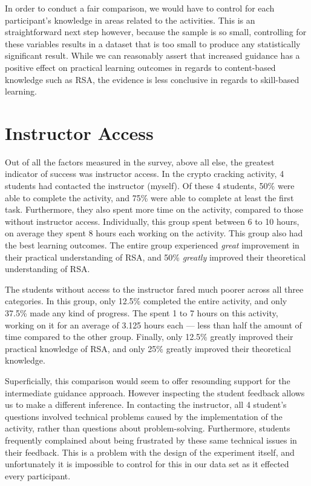         In order to conduct a fair comparison, we would have to control for each participant's knowledge in areas related to the activities. 
        This is an straightforward next step however, because the sample is so small, controlling for these variables results in a dataset that is too small to produce any statistically significant result. 
        While we can reasonably assert that increased guidance has a positive effect on practical learning outcomes in regards to content-based knowledge such as RSA, the evidence is less conclusive in regards to skill-based learning. 


    \section{Instructor Access}
        Out of all the factors measured in the survey, above all else, the greatest indicator of success was instructor access. 
        In the crypto cracking activity, 4 students had contacted the instructor (myself). 
        Of these 4 students, 50\% were able to complete the activity, and 75\% were able to complete at least the first task. 
        Furthermore, they also spent more time on the activity, compared to those without instructor access. 
        Individually, this group spent between 6 to 10 hours, on average they spent 8 hours each working on the activity. 
        This group also had the best learning outcomes. 
        The entire group experienced \emph{great} improvement in their practical understanding of RSA, and 50\% \emph{greatly} improved their theoretical understanding of RSA.

        The students without access to the instructor fared much poorer across all three categories. 
        In this group, only 12.5\% completed the entire activity, and only 37.5\% made any kind of progress. 
        The spent 1 to 7 hours on this activity, working on it for an average of 3.125 hours each --- 
        less than half the amount of time compared to the other group. 
        Finally, only 12.5\% greatly improved their practical knowledge of RSA, and only 25\% greatly improved their theoretical knowledge. 

        Superficially, this comparison would seem to offer resounding support for the intermediate guidance approach. 
        However inspecting the student feedback allows us to make a different inference. 
        In contacting the instructor, all 4 student's questions involved technical problems caused by the implementation of the activity, rather than questions about problem-solving. 
        Furthermore, students frequently complained about being frustrated by these same technical issues in their feedback. 
        This is a problem with the design of the experiment itself, and unfortunately it is impossible to control for this in our data set as it effected every participant. 

